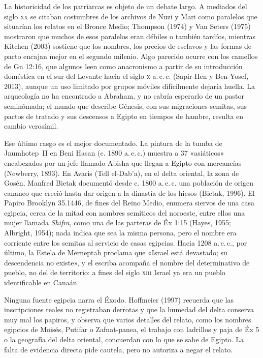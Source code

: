 \documentclass[11pt,letterpaper]{article}
\begin{document}
La historicidad de los patriarcas es objeto de un debate largo. A mediados del siglo \textsc{xx} se citaban costumbres de los archivos de Nuzi y Mari como paralelos que situarían los relatos en el Bronce Medio; Thompson (1974) y Van Seters (1975) mostraron que muchos de esos paralelos eran débiles o también tardíos, mientras Kitchen (2003) sostiene que los nombres, los precios de esclavos y las formas de pacto encajan mejor en el segundo milenio. Algo parecido ocurre con los camellos de Gn 12:16, que algunos leen como anacronismo a partir de su introducción doméstica en el sur del Levante hacia el siglo \textsc{x} a.\,e.\,c. (Sapir-Hen y Ben-Yosef, 2013), aunque un uso limitado por grupos móviles difícilmente dejaría huella. La arqueología no ha encontrado a Abraham, y no cabría esperarlo de un pastor seminómada; el mundo que describe Génesis, con sus migraciones semitas, sus pactos de tratado y sus descensos a Egipto en tiempos de hambre, resulta en cambio verosímil.

Ese último rasgo es el mejor documentado. La pintura de la tumba de Jnumhotep~II en Beni Hasan (c. 1890 a.\,e.\,c.) muestra a 37 «asiáticos» encabezados por un jefe llamado Abisha que llegan a Egipto con mercancías (Newberry, 1893). En Avaris (Tell el-Dab\textquoteright a), en el delta oriental, la zona de Gosén, Manfred Bietak documentó desde c. 1800 a.\,e.\,c. una población de origen cananeo que creció hasta dar origen a la dinastía de los hicsos (Bietak, 1996). El Papiro Brooklyn 35.1446, de fines del Reino Medio, enumera siervos de una casa egipcia, cerca de la mitad con nombres semíticos del noroeste, entre ellos una mujer llamada \emph{Shifra}, como una de las parteras de Éx 1:15 (Hayes, 1955; Albright, 1954); nada indica que sea la misma persona, pero el nombre era corriente entre los semitas al servicio de casas egipcias. Hacia 1208 a.\,e.\,c., por último, la Estela de Merneptah proclama que «Israel está devastado; su descendencia no existe», y el escriba acompaña el nombre del determinativo de pueblo, no del de territorio: a fines del siglo \textsc{xiii} Israel ya era un pueblo identificable en Canaán.

Ninguna fuente egipcia narra el Éxodo. Hoffmeier (1997) recuerda que las inscripciones reales no registraban derrotas y que la humedad del delta conserva muy mal los papiros, y observa que varios detalles del relato, como los nombres egipcios de Moisés, Putifar o Zafnat-panea, el trabajo con ladrillos y paja de Éx 5 o la geografía del delta oriental, concuerdan con lo que se sabe de Egipto. La falta de evidencia directa pide cautela, pero no autoriza a negar el relato.
\end{document}
